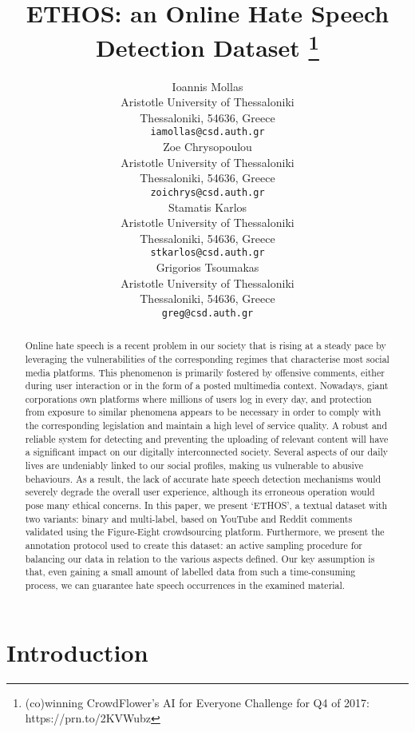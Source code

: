 \documentclass{article}
\title{ETHOS: an Online Hate Speech Detection Dataset
\thanks{(co)winning CrowdFlower’s AI for Everyone Challenge for Q4 of 2017: https://prn.to/2KVWubz}
}
\author{
  Ioannis Mollas \\
  Aristotle University of Thessaloniki\\
  Thessaloniki, 54636, Greece\\
  \texttt{iamollas@csd.auth.gr} \\
   \And
  Zoe Chrysopoulou \\
  Aristotle University of Thessaloniki\\
  Thessaloniki, 54636, Greece\\
  \texttt{zoichrys@csd.auth.gr} \\
  \And
    Stamatis Karlos \\
  Aristotle University of Thessaloniki\\
  Thessaloniki, 54636, Greece\\
  \texttt{stkarlos@csd.auth.gr} \\
  \And
    Grigorios Tsoumakas \\
  Aristotle University of Thessaloniki\\
  Thessaloniki, 54636, Greece\\
  \texttt{greg@csd.auth.gr} \\
}
\begin{document}
\maketitle

\begin{abstract}
Online hate speech is a recent problem in our society that is rising at a steady pace by leveraging the vulnerabilities of the corresponding regimes that characterise most social media platforms. This phenomenon is primarily fostered by offensive comments, either during user interaction or in the form of a posted multimedia context. Nowadays, giant corporations own platforms where millions of users log in every day, and protection from exposure to similar phenomena appears to be necessary in order to comply with the corresponding legislation and maintain a high level of service quality. A robust and reliable system for detecting and preventing the uploading of relevant content will have a significant impact on our digitally interconnected society. Several aspects of our daily lives are undeniably linked to our social profiles, making us vulnerable to abusive behaviours. As a result, the lack of accurate hate speech detection mechanisms would severely degrade the overall user experience, although its erroneous operation would pose many ethical concerns. In this paper, we present `ETHOS’, a textual dataset with two variants: binary and multi-label, based on YouTube and Reddit comments validated using the Figure-Eight crowdsourcing platform. Furthermore, we present the annotation protocol used to create this dataset: an active sampling procedure for balancing our data in relation to the various aspects defined. Our key assumption is that, even gaining a small amount of labelled data from such a time-consuming process, we can guarantee hate speech occurrences in the examined material.
\end{abstract}




\section{Introduction}
\end{document}

